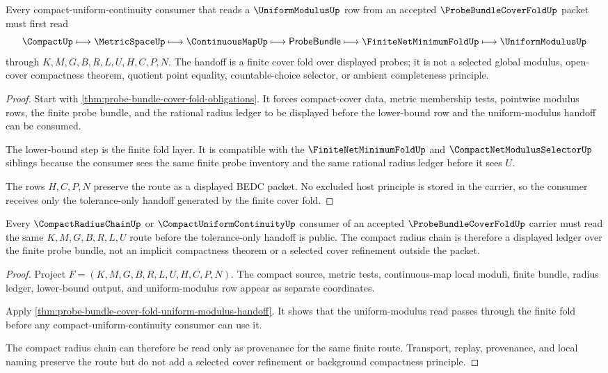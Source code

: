\begin{theorem}
\label{thm:probe-bundle-cover-fold-uniform-modulus-handoff}
Every compact-uniform-continuity consumer that reads a $\UniformModulusUp$ row from an accepted $\ProbeBundleCoverFoldUp$ packet must first read
$$
\CompactUp \longmapsto \MetricSpaceUp \longmapsto \ContinuousMapUp \longmapsto \mathsf{ProbeBundle} \longmapsto \FiniteNetMinimumFoldUp \longmapsto \UniformModulusUp
$$
through $K,M,G,B,R,L,U,H,C,P,N$. The handoff is a finite cover fold over displayed probes; it is not a selected global modulus, open-cover compactness theorem, quotient point equality, countable-choice selector, or ambient completeness principle.
\end{theorem}
\begin{proof}
Start with \autoref{thm:probe-bundle-cover-fold-obligations}. It forces compact-cover data, metric membership tests, pointwise modulus rows, the finite probe bundle, and the rational radius ledger to be displayed before the lower-bound row and the uniform-modulus handoff can be consumed.

The lower-bound step is the finite fold layer. It is compatible with the $\FiniteNetMinimumFoldUp$ and $\CompactNetModulusSelectorUp$ siblings because the consumer sees the same finite probe inventory and the same rational radius ledger before it sees $U$.

The rows $H,C,P,N$ preserve the route as a displayed BEDC packet. No excluded host principle is stored in the carrier, so the consumer receives only the tolerance-only handoff generated by the finite cover fold.
\end{proof}

\begin{theorem}
\label{thm:probe-bundle-cover-fold-compact-radius-route}
Every $\CompactRadiusChainUp$ or $\CompactUniformContinuityUp$ consumer of an accepted $\ProbeBundleCoverFoldUp$ carrier must read the same $K,M,G,B,R,L,U$ route before the tolerance-only handoff is public. The compact radius chain is therefore a displayed ledger over the finite probe bundle, not an implicit compactness theorem or a selected cover refinement outside the packet.
\end{theorem}
\begin{proof}
Project $F=(K,M,G,B,R,L,U,H,C,P,N)$. The compact source, metric tests, continuous-map local moduli, finite bundle, radius ledger, lower-bound output, and uniform-modulus row appear as separate coordinates.

Apply \autoref{thm:probe-bundle-cover-fold-uniform-modulus-handoff}. It shows that the uniform-modulus read passes through the finite fold before any compact-uniform-continuity consumer can use it.

The compact radius chain can therefore be read only as provenance for the same finite route. Transport, replay, provenance, and local naming preserve the route but do not add a selected cover refinement or background compactness principle.
\end{proof}

